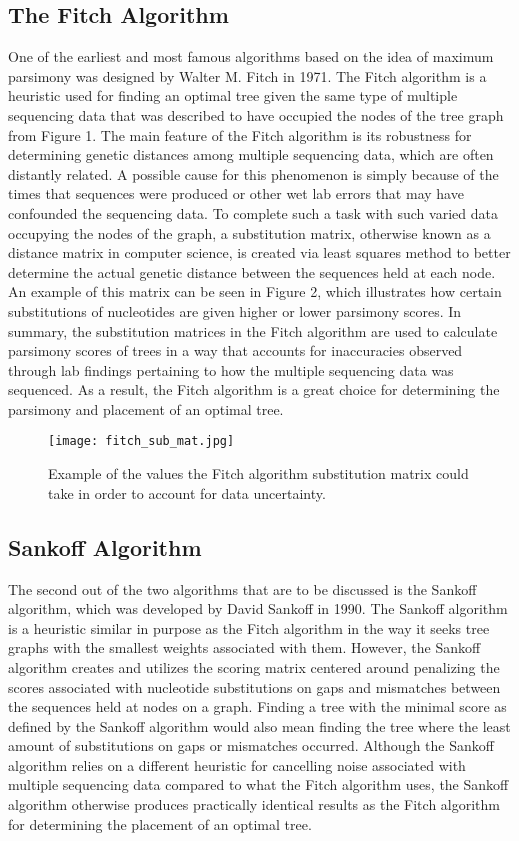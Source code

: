 \documentclass[12pt,journal,compsoc]{IEEEtran}
\begin{document}
\subsection{The Fitch Algorithm}
One of the earliest and most famous algorithms based on the idea of maximum parsimony was designed by Walter M. Fitch in 1971\cite{algo:fitch}. The Fitch algorithm is a heuristic used for finding an optimal tree given the same type of multiple sequencing data that was described to have occupied the nodes of the tree graph from Figure 1. The main feature of the Fitch algorithm is its robustness for determining genetic distances among multiple sequencing data, which are often distantly related. A  possible cause for this phenomenon is simply because of the times that sequences were produced or other wet lab errors that may have confounded the sequencing data. To complete such a task with such varied data occupying the nodes of the graph, a substitution matrix, otherwise known as a distance matrix in computer science, is created via least squares method to better determine the actual genetic distance between the sequences held at each node. An example of this matrix can be seen in Figure 2, which illustrates how certain substitutions of nucleotides are given higher or lower parsimony scores. In summary, the substitution matrices in the Fitch algorithm are used to calculate parsimony scores of trees in a way that accounts for inaccuracies observed through lab findings pertaining to how the multiple sequencing data was sequenced. As a result, the Fitch algorithm is a great choice for determining the parsimony and placement of an optimal tree.

\begin{figure}[H]
    \centering
    \texttt{[image: fitch\_sub\_mat.jpg]}
    \caption{Example of the values the Fitch algorithm substitution matrix could take in order to account for data uncertainty\cite{cs:brown}.}
\end{figure}

\subsection{Sankoff Algorithm}
The second out of the two algorithms that are to be discussed is the Sankoff algorithm, which was developed by David Sankoff in 1990\cite{algo:sankoff}. The Sankoff algorithm is a heuristic similar in purpose as the Fitch algorithm in the way it seeks tree graphs with the smallest weights associated with them. However, the Sankoff algorithm creates and utilizes the scoring matrix centered around penalizing the scores associated with nucleotide substitutions on gaps and mismatches between the sequences held at nodes on a graph. Finding a tree with the minimal score as defined by the Sankoff algorithm would also mean finding the tree where the least amount of substitutions on gaps or mismatches occurred. Although the Sankoff algorithm relies on a different heuristic for cancelling noise associated with multiple sequencing data compared to what the Fitch algorithm uses, the Sankoff algorithm otherwise produces practically identical results as the Fitch algorithm for determining the placement of an optimal tree.
\end{document}
